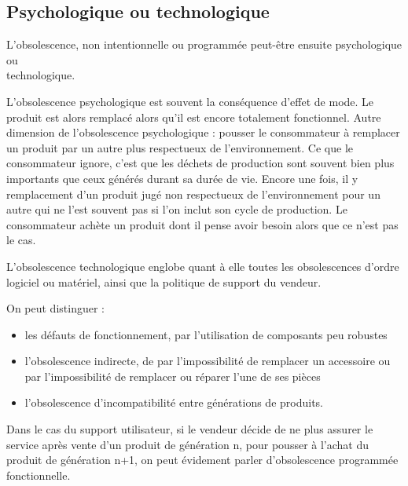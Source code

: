 \subsection{Psychologique ou technologique}

L’obsolescence, non intentionnelle ou programmée peut-être ensuite psychologique ou\\ technologique. 

\bigbreak
L’obsolescence psychologique est souvent la conséquence d’effet de mode. Le produit est alors remplacé alors qu’il est encore totalement fonctionnel. Autre dimension de l’obsolescence psychologique : pousser le consommateur à remplacer un produit par un autre plus respectueux de l’environnement.
Ce que le consommateur ignore, c’est que les déchets de production sont souvent bien plus importants que ceux générés durant sa durée de vie. Encore une fois, il y remplacement d’un produit jugé non respectueux de l’environnement pour un autre qui ne l’est souvent pas si l’on inclut son cycle de production. Le consommateur achète un produit dont il pense avoir besoin alors que ce n'est pas le cas.

\medbreak
L’obsolescence technologique englobe quant à elle toutes les obsolescences d’ordre logiciel ou matériel, ainsi que la politique de support du vendeur. 

On peut distinguer :
\begin{itemize}
  \item les défauts de fonctionnement, par l’utilisation de composants peu robustes
  \item l’obsolescence indirecte, de par l'impossibilité de remplacer un accessoire ou par l’impossibilité de remplacer ou réparer l’une de ses pièces
  \item l’obsolescence d’incompatibilité entre générations de produits.
\end{itemize}


\bigbreak
Dans le cas du support utilisateur, si le vendeur décide de ne plus assurer le service après vente d’un produit de génération n, pour pousser à l’achat du produit de génération n+1, on peut évidement parler d'obsolescence programmée fonctionnelle.

